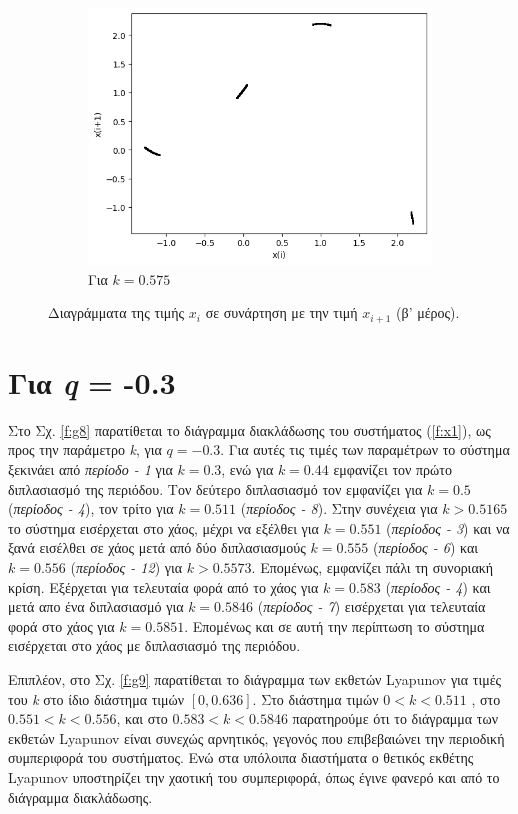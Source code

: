 \begin{figure}[ht]
\begin{subfigure}[c]{0.4\textwidth}
		\includegraphics[width=\textwidth]{LateX images/graphs/k0575}
		\caption{Για $k=0.575$}
		\label{f:k14}
	\end{subfigure}
	\caption{Διαγράμματα της τιμής \(x_i\) σε συνάρτηση με την τιμή \(x_{i+1}\) (β' μέρος).}
\end{figure}
\vfill
\clearpage
\newpage
\section{Για \emph{q} = -0.3}

Στο Σχ. \ref{f:g8} παρατίθεται το διάγραμμα διακλάδωσης του συστήματος (\ref{f:x1}), ως προς την παράμετρο \emph{k}, για $q =-0.3$. Για αυτές τις τιμές των παραμέτρων το σύστημα ξεκινάει από \emph{περίοδο - 1} για $k=0.3$, ενώ για  $k = 0.44$ εμφανίζει τον πρώτο διπλασιασμό της περιόδου. Τον δεύτερο διπλασιασμό τον εμφανίζει για $k=0.5$ (\emph{περίοδος -   4}), τον τρίτο για $k=0.511$ (\emph{περίοδος -   8}). Στην συνέχεια για $k>0.5165$ το σύστημα εισέρχεται στο χάος, μέχρι να εξέλθει  για $k=0.551$ (\emph{περίοδος -   3}) και να ξανά εισέλθει σε χάος μετά από δύο διπλασιασμούς $k=0.555$ (\emph{περίοδος - 6}) και $k=0.556$ (\emph{περίοδος - 12}) για $k>0.5573$. Επομένως, εμφανίζει πάλι τη συνοριακή κρίση. Εξέρχεται για τελευταία φορά από το χάος για $k=0.583$ (\emph{περίοδος - 4}) και μετά απο ένα διπλασιασμό  για $k=0.5846$ (\emph{περίοδος - 7}) εισέρχεται για τελευταία φορά στο χάος για $k=0.5851$.
Επομένως και σε αυτή την περίπτωση το σύστημα εισέρχεται στο χάος με διπλασιασμό της περιόδου. 

Επιπλέον, στο Σχ. \ref{f:g9} παρατίθεται το διάγραμμα των εκθετών Lyapunov για τιμές του \emph{k} στο ίδιο διάστημα τιμών $[0, 0.636]$. Στο διάστημα τιμών   $0<k<0.511$ , στο $0.551<k<0.556$, και στο $0.583<k<0.5846$ παρατηρούμε ότι το διάγραμμα των εκθετών Lyapunov είναι συνεχώς αρνητικός, γεγονός που επιβεβαιώνει την περιοδική συμπεριφορά του συστήματος. Ενώ στα υπόλοιπα διαστήματα ο θετικός εκθέτης Lyapunov υποστηρίζει την χαοτική του συμπεριφορά, όπως έγινε φανερό και από το διάγραμμα διακλάδωσης.

